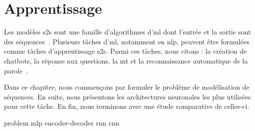 \chapter{Apprentissage }

Les modèles \gls{s2s} sont une famille d'algorithmes d'\gls{ml}
dont l'entrée et la sortie sont des séquences~\cite{Martins_2018}.
Plusieurs tâches d'\gls{ml}, notamment en \gls{nlp}, 
peuvent être formulées comme tâches d'apprentissage \gls{s2s}.
Parmi ces tâches, nous citons : la création de chatbots, la réponse aux questions, 
la \gls{mt} et la reconnaissance automatique de la parole~\cite{Fathi_2021}.

Dans ce chapitre, nous commençons par formuler le problème de modélisation de séquences.
En suite, nous présentons les architectures neuronales les plus utilisées pour cette tâche.
En fin, nous terminons avec une étude comparative de celles-ci.

{problem}
{mlp}
{encoder-decoder}
{rnn}
{cnn}

